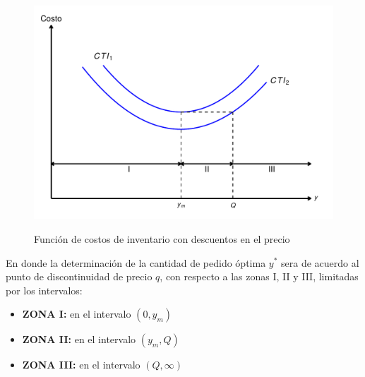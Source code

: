 \begin{figure}[H]
  \caption{Función de costos de inventario con descuentos en el precio}
  {\includegraphics[width=15cm, height=8cm]{images/img3.pdf}}
  \label{fig:img3}
\end{figure} 
En donde la determinación de la cantidad de pedido óptima $y^*$ sera de acuerdo al punto de discontinuidad de precio $q$, con respecto a las zonas I, II y III, limitadas por los intervalos:

\begin{itemize}
	\item \textbf{ZONA I:} en el intervalo $(0, y_m)$
	\item \textbf{ZONA II:} en el intervalo $(y_m, Q)$
	\item \textbf{ZONA III:} en el intervalo $(Q, \infty)$
\end{itemize}

